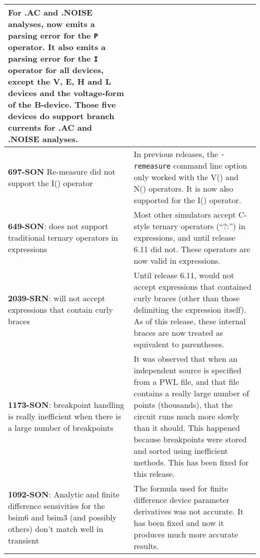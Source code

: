 {\begin{longtable}[h] {>{\raggedright\small}m{2in}|>{\raggedright\let\\\tabularnewline\small}m{3.5in}}
For .AC and .NOISE analyses,  \Xyce{} now emits a parsing error for the \texttt{P}
operator.  It also emits a parsing error for the \texttt{I} operator for all devices,
except the V, E, H and L devices and the voltage-form of the B-device.  Those five
devices do support branch currents for .AC and .NOISE analyses. \\ \hline

\textbf{697-SON} Re-measure did not support the  I() operator & In previous \Xyce{} 
releases, the \texttt{-remeasure} command line option only worked with the V() 
and N() operators.  It is now also supported for the I() operator. \\ \hline 

\textbf{649-SON}: \Xyce{} does not support traditional ternary operators in expressions &
 Most other simulators accept C-style ternary operators (``?:'') in
 expressions, and until release 6.11 \Xyce{} did not.  These operators
 are now valid in \Xyce{} expressions. \\ \hline

\textbf{2039-SRN}: \Xyce{} will not accept expressions that contain curly braces &
  Until release 6.11, \Xyce{} would not accept expressions that
  contained curly braces (other than those delimiting the expression
  itself).  As of this release, these internal braces are now treated
  as equivalent to parentheses.  \\ \hline


\textbf{1173-SON}: breakpoint handling is really inefficient when there is a large number of breakpoints &  It was observed that when an independent source is specified from a PWL file, and that file contains a really large number of points (thousands), that the circuit runs much more slowly than it should.  This happened because breakpoints were stored and sorted using inefficient methods.  This has been fixed for this release.  \\ \hline

\textbf{1092-SON}: Analytic and finite difference sensivities for the bsim6 and bsim3 (and possibly others) don't match well in transient &   The formula used for finite difference device parameter derivatives was not accurate.  It has been fixed and now it produces much more accurate results.  
\\ \hline

\end{longtable}
}
